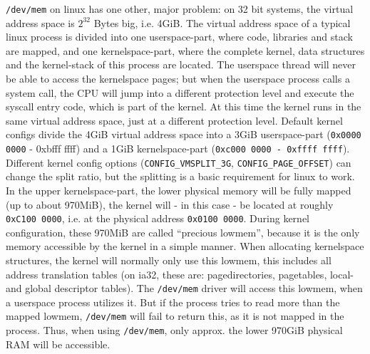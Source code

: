 \texttt{/dev/mem} on linux has one other, major problem: on 32 bit systems, the
virtual address space is $2^{32}$ Bytes big, i.e. 4GiB. The virtual address
space of a typical linux process is divided into one userspace-part, where code,
libraries and stack are mapped, and one kernelspace-part, where the complete
kernel, data structures and the kernel-stack of this process are located. The
userspace thread will never be able to access the kernelspace pages; but when
the userspace process calls a system call, the CPU will jump into a different
protection level and execute the syscall entry code, which is part of the
kernel. At this time the kernel runs in the same virtual address space, just at
a different protection level. Default kernel configs divide the 4GiB virtual
address space into a 3GiB userspace-part (\texttt{0x0000 0000} - {0xbfff ffff})
and a 1GiB kernelspace-part (\texttt{0xc000 0000 - 0xffff ffff}). Different
kernel config options (\texttt{CONFIG\_VMSPLIT\_3G},
\texttt{CONFIG\_PAGE\_OFFSET}) can change the split ratio, but the splitting is
a basic requirement for linux to work. In the upper kernelspace-part, the lower
physical memory will be fully mapped (up to about 970MiB), the kernel will - in
this case - be located at roughly \texttt{0xC100 0000}, i.e. at the physical
address \texttt{0x0100 0000}. During kernel configuration, these 970MiB are
called ``precious lowmem'', because it is the only memory accessible by the
kernel in a simple manner. When allocating kernelspace structures, the kernel
will normally only use this lowmem, this includes all address translation tables
(on ia32, these are: pagedirectories, pagetables, local- and global descriptor
tables)\label{linuxATTinlowmem}. The \texttt{/dev/mem} driver will access this
lowmem, when a userspace process utilizes it. But if the process tries to read
more than the mapped lowmem, \texttt{/dev/mem} will fail to return this, as it
is not mapped in the process.  Thus, when using \texttt{/dev/mem}, only approx.
the lower 970GiB physical RAM will be accessible.

